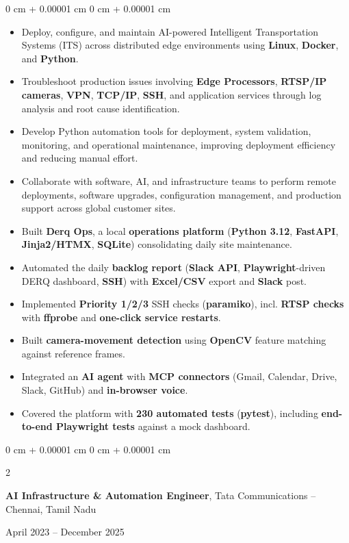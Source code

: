\documentclass[10pt, letterpaper]{article}
\newenvironment{highlights}{
    \begin{itemize}[
        topsep=0.10 cm,
        parsep=0.10 cm,
        partopsep=0pt,
        itemsep=0pt,
        leftmargin=0 cm + 10pt
    ]
}{
    \end{itemize}
} %
\newenvironment{onecolentry}{
    \begin{adjustwidth}{
        0 cm + 0.00001 cm
    }{
        0 cm + 0.00001 cm
    }
}{
    \end{adjustwidth}
} %
\newenvironment{twocolentry}[2][]{
    \onecolentry
    \def\secondColumn{#2}
    \setcolumnwidth{\fill, 4.5 cm}
    \begin{paracol}{2}
}{
    \switchcolumn \raggedleft \secondColumn
    \end{paracol}
    \endonecolentry
} %
\begin{document}
\begin{onecolentry}
    \begin{highlights}
        \item Deploy, configure, and maintain AI-powered Intelligent Transportation Systems (ITS) across distributed edge environments using \textbf{Linux}, \textbf{Docker}, and \textbf{Python}.
        \item Troubleshoot production issues involving \textbf{Edge Processors}, \textbf{RTSP/IP cameras}, \textbf{VPN}, \textbf{TCP/IP}, \textbf{SSH}, and application services through log analysis and root cause identification.
        \item Develop Python automation tools for deployment, system validation, monitoring, and operational maintenance, improving deployment efficiency and reducing manual effort.
        \item Collaborate with software, AI, and infrastructure teams to perform remote deployments, software upgrades, configuration management, and production support across global customer sites.
        \item Built \textbf{Derq Ops}, a local \textbf{operations platform} (\textbf{Python 3.12}, \textbf{FastAPI}, \textbf{Jinja2/HTMX}, \textbf{SQLite}) consolidating daily site maintenance.
        \item Automated the daily \textbf{backlog report} (\textbf{Slack API}, \textbf{Playwright}-driven DERQ dashboard, \textbf{SSH}) with \textbf{Excel/CSV} export and \textbf{Slack} post.
        \item Implemented \textbf{Priority 1/2/3} SSH checks (\textbf{paramiko}), incl. \textbf{RTSP checks} with \textbf{ffprobe} and \textbf{one-click service restarts}.
        \item Built \textbf{camera-movement detection} using \textbf{OpenCV} feature matching against reference frames.
        \item Integrated an \textbf{AI agent} with \textbf{MCP connectors} (Gmail, Calendar, Drive, Slack, GitHub) and \textbf{in-browser voice}.
        \item Covered the platform with \textbf{230 automated tests} (\textbf{pytest}), including \textbf{end-to-end Playwright tests} against a mock dashboard.
    \end{highlights}
\end{onecolentry}
\vspace{0.20cm}
\begin{twocolentry}{
    April 2023 – December 2025
}
    \textbf{AI Infrastructure \& Automation Engineer}, Tata Communications -- Chennai, Tamil Nadu
\end{twocolentry}
\end{document}

